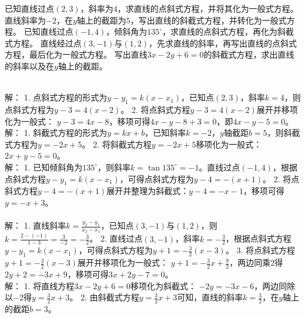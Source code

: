 \begin{Exercise}[title={直线方程相关练习}, label={ex:line_equations}]
    \Question 已知直线过点\((2,3)\)，斜率为\(4\)，求直线的点斜式方程，并将其化为一般式方程。
    \Question 直线斜率为\(-2\)，在\(y\)轴上的截距为\(5\)，写出直线的斜截式方程，并转化为一般式方程。
    \Question 已知直线过点\((-1,4)\)，倾斜角为\(135^{\circ}\)，求直线的点斜式方程，再化为斜截式方程。
    \Question 直线经过点\((3, -1)\)与\((1,2)\)，先求直线的斜率，再写出直线的点斜式方程，最后化为一般式方程。
    \Question 写出直线\(3x - 2y + 6 = 0\)的斜截式方程，求出直线的斜率以及在\(y\)轴上的截距。
\end{Exercise}
\begin{MyAnswer}[ref={ex:line_equations}]
    \Question
        \\
        解：
        1. 点斜式方程的形式为\(y - y_1 = k(x - x_1)\)，已知点\((2,3)\)，斜率\(k = 4\)，则点斜式方程为\(y - 3 = 4(x - 2)\)。
        2. 将点斜式方程\(y - 3 = 4(x - 2)\)展开并移项化为一般式：
        \(y - 3 = 4x - 8\)，移项可得\(4x - y - 8 + 3 = 0\)，即\(4x - y - 5 = 0\)。
    \Question
        \\
        解：
        1. 斜截式方程的形式为\(y = kx + b\)，已知斜率\(k = -2\)，\(y\)轴截距\(b = 5\)，则斜截式方程为\(y = -2x + 5\)。
        2. 将斜截式方程\(y = -2x + 5\)移项化为一般式：\(2x + y - 5 = 0\)。
    \Question
        \\
        解：
        1. 已知倾斜角为\(135^{\circ}\)，则斜率\(k=\tan135^{\circ}=-1\)。直线过点\((-1,4)\)，根据点斜式方程\(y - y_1 = k(x - x_1)\)，可得点斜式方程为\(y - 4 = -(x + 1)\)。
        2. 将点斜式方程\(y - 4 = -(x + 1)\)展开并整理为斜截式：\(y - 4 = -x - 1\)，移项可得\(y = -x + 3\)。
    \Question
        \\
        \\
        解：
        1. 直线斜率\(k=\frac{y_2 - y_1}{x_2 - x_1}\)，已知点\((3, -1)\)与\((1,2)\)，则\(k=\frac{2 - (-1)}{1 - 3}=\frac{3}{-2}=-\frac{3}{2}\)。
        2. 直线过点\((3, -1)\)，斜率\(k = -\frac{3}{2}\)，根据点斜式方程\(y - y_1 = k(x - x_1)\)，可得点斜式方程为\(y + 1 = -\frac{3}{2}(x - 3)\)。
        3. 将点斜式方程\(y + 1 = -\frac{3}{2}(x - 3)\)展开并移项化为一般式：
        \(y + 1 = -\frac{3}{2}x+\frac{9}{2}\)，两边同乘\(2\)得\(2y + 2 = -3x + 9\)，移项可得\(3x + 2y - 7 = 0\)。
    \Question
        \\
        解：
        1. 将直线方程\(3x - 2y + 6 = 0\)移项化为斜截式：
        \(-2y=-3x - 6\)，两边同除以\(-2\)得\(y=\frac{3}{2}x + 3\)。
        2. 由斜截式方程\(y=\frac{3}{2}x + 3\)可知，直线的斜率\(k=\frac{3}{2}\)，在\(y\)轴上的截距\(b = 3\)。
\end{MyAnswer}





